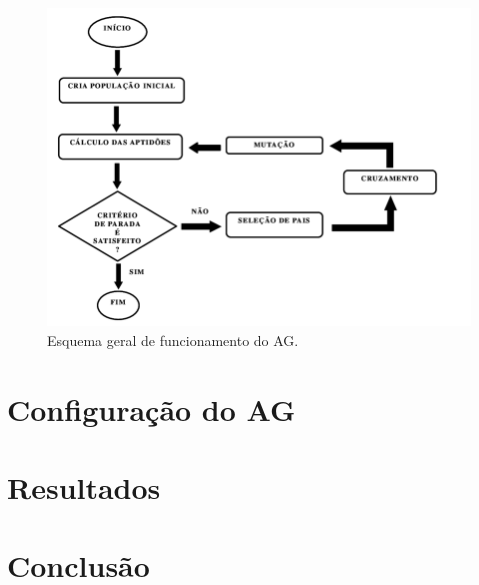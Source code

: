 \documentclass[
article,			%
11pt,				%
oneside,			%
a4paper,			%
english,			%
brazil,				%
sumario=tradicional
]{article}
\begin{document}
	\begin{figure}[H]
		\centering
		\includegraphics[width=1\textwidth]{Figuras/funcionamento-ag.png}
		\caption{Esquema geral de funcionamento do AG.}
	\end{figure}
	
	
	\section{Configuração do AG}
	


	\section{Resultados}

	
	\section{Conclusão}
	
\end{document}
